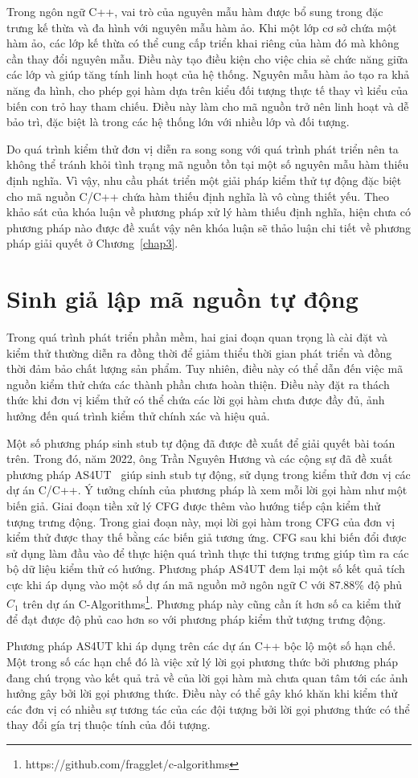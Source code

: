 Trong ngôn ngữ C++, vai trò của nguyên mẫu hàm được bổ sung trong đặc trưng kế thừa và đa hình với nguyên mẫu hàm ảo. Khi một lớp cơ sở chứa một hàm ảo, các lớp kế thừa có thể cung cấp triển khai riêng của hàm đó mà không cần thay đổi nguyên mẫu. Điều này tạo điều kiện cho việc chia sẻ chức năng giữa các lớp và giúp tăng tính linh hoạt của hệ thống. Nguyên mẫu hàm ảo tạo ra khả năng đa hình, cho phép gọi hàm dựa trên kiểu đối tượng thực tế thay vì kiểu của biến con trỏ hay tham chiếu. Điều này làm cho mã nguồn trở nên linh hoạt và dễ bảo trì, đặc biệt là trong các hệ thống lớn với nhiều lớp và đối tượng.

Do quá trình kiểm thử đơn vị diễn ra song song với quá trình phát triển nên ta không thể tránh khỏi tình trạng mã nguồn tồn tại một số nguyên mẫu hàm thiếu định nghĩa. Vì vậy, nhu cầu phát triển một giải pháp kiểm thử tự động đặc biệt cho mã nguồn C/C++ chứa hàm thiếu định nghĩa là vô cùng thiết yếu. Theo khảo sát của khóa luận về phương pháp xử lý hàm thiếu định nghĩa, hiện chưa có phương pháp nào được đề xuất vậy nên khóa luận sẽ thảo luận chi tiết về phương pháp giải quyết ở Chương~\ref{chap3}.

\section{Sinh giả lập mã nguồn tự động} \label{sec:autostub-Lam}
Trong quá trình phát triển phần mềm, hai giai đoạn quan trọng là cài đặt và kiểm thử thường diễn ra đồng thời để giảm thiểu thời gian phát triển và đồng thời đảm bảo chất lượng sản phẩm. Tuy nhiên, điều này có thể dẫn đến việc mã nguồn kiểm thử chứa các thành phần chưa hoàn thiện. Điều này đặt ra thách thức khi đơn vị kiểm thử có thể chứa các lời gọi hàm chưa được đầy đủ, ảnh hưởng đến quá trình kiểm thử chính xác và hiệu quả.

Một số phương pháp sinh stub tự động đã được đề xuất để giải quyết bài toán trên. Trong đó, năm 2022, ông Trần Nguyên Hương và các cộng sự đã đề xuất phương pháp AS4UT~\cite{TUNG2022106821} giúp sinh stub tự động, sử dụng trong kiểm thử đơn vị các dự án C/C++. Ý tưởng chính của phương pháp là xem mỗi lời gọi hàm như một biến giả. Giai đoạn tiền xử lý CFG được thêm vào hướng tiếp cận kiểm thử tượng trưng động. Trong giai đoạn này, mọi lời gọi hàm trong CFG của đơn vị kiểm thử được thay thế bằng các biến giả tương ứng. CFG sau khi biến đổi được sử dụng làm đầu vào để thực hiện quá trình thực thi tượng trưng giúp tìm ra các bộ dữ liệu kiểm thử có hướng. Phương pháp AS4UT đem lại một số kết quả tích cực khi áp dụng vào một số dự án mã nguồn mở ngôn ngữ C với 87.88\% độ phủ $C_1$ trên dự án C-Algorithms\footnote{https://github.com/fragglet/c-algorithms}. Phương pháp này cũng cần ít hơn số ca kiểm thử để đạt được độ phủ cao hơn so với phương pháp kiểm thử tượng trưng động.

Phương pháp AS4UT khi áp dụng trên các dự án C++ bộc lộ một số hạn chế. Một trong số các hạn chế đó là việc xử lý lời gọi phương thức bởi phương pháp đang chú trọng vào kết quả trả về của lời gọi hàm mà chưa quan tâm tới các ảnh hưởng gây bởi lời gọi phương thức. Điều này có thể gây khó khăn khi kiểm thử các đơn vị có nhiều sự tương tác của các đội tượng bởi lời gọi phương thức có thể thay đổi gía trị thuộc tính của đối tượng.